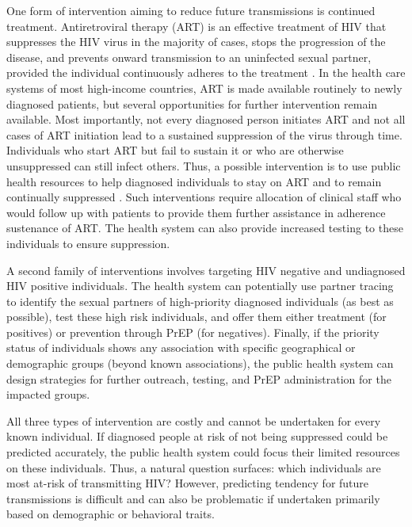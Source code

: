 \documentclass[oupdraft]{sysbio}
\begin{document}
One form of intervention aiming to reduce future transmissions is continued treatment. 
Antiretroviral therapy (ART) is an effective treatment of HIV that suppresses the HIV virus in the majority of cases, stops the progression of the disease, and prevents onward transmission to an uninfected sexual partner, provided the individual continuously adheres to the treatment \citep{Cohen2011}.
In the health care systems of most high-income countries, ART is made available routinely  to newly diagnosed patients, but several opportunities for further intervention remain available. 
Most importantly, not every diagnosed person initiates ART and not all cases of ART initiation lead to a sustained suppression of the virus through time. 
Individuals who start ART but fail to sustain it or who are otherwise unsuppressed can still infect others. 
Thus, a possible intervention is to use public health resources to help diagnosed individuals to stay on ART and to remain continually suppressed \citep{Poon2016}. 
Such interventions require allocation of clinical staff who would follow up with patients to provide them further assistance in adherence sustenance of ART.
The health system can also provide  increased testing to these individuals to ensure suppression.  

A second family of interventions involves targeting HIV negative and undiagnosed HIV positive individuals.
The health system can potentially use partner tracing \citep{Gotz2014} to identify the sexual partners of high-priority diagnosed individuals (as best as possible), test these high risk individuals, and offer them either treatment (for positives) or prevention through PrEP (for negatives). 
Finally, if the  priority status of individuals shows any association with specific geographical or demographic groups (beyond known associations), the public health system can design strategies for further outreach, testing, and PrEP administration for the impacted groups.

All three types of intervention   are  costly and cannot be undertaken for every known individual.
If diagnosed people at risk of not being suppressed could be predicted accurately, the public health system could focus their limited resources on these individuals.
Thus, a natural question surfaces: which individuals are most at-risk of transmitting HIV? %
However, predicting tendency for future transmissions is difficult and can also be problematic if undertaken primarily based on demographic or behavioral traits.
\end{document}
